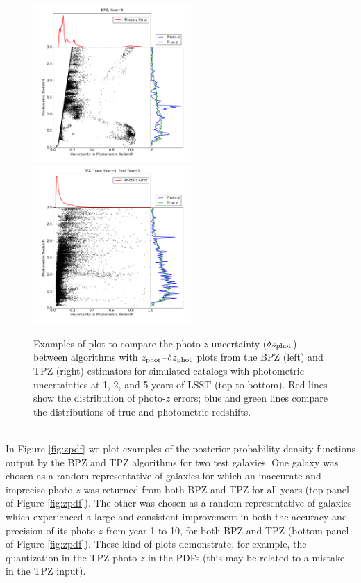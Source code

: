 \documentclass[DM,lsstdraft,toc]{lsstdoc}
\begin{document}
\begin{figure}
\begin{center}
\includegraphics[width=6cm,trim={1cm 1cm 1cm 0cm}, clip]{figures/zp_zpe_bpz_euclid_5_2.png}
\includegraphics[width=6cm,trim={1cm 1cm 1cm 0cm}, clip]{figures/zp_zpe_tpz_euclid_5_5_2.png}
\caption{Examples of plot to compare the photo-$z$ uncertainty ($\delta z_{\rm phot}$) between algorithms with $z_{\rm phot}$--$\delta z_{\rm phot}$ plots from the BPZ (left) and TPZ (right) estimators for simulated catalogs with photometric uncertainties at 1, 2, and 5 years of LSST (top to bottom). Red lines show the distribution of photo-$z$ errors; blue and green lines compare the distributions of true and photometric redshifts. \label{fig:pzpze}}
\end{center}
\end{figure}


\smallskip {} \\
In Figure \ref{fig:zpdf} we plot examples of the posterior probability density functions output by the BPZ and TPZ algorithms for two test galaxies. One galaxy was chosen as a random representative of galaxies for which an inaccurate and imprecise photo-$z$ was returned from both BPZ and TPZ for all years (top panel of Figure \ref{fig:zpdf}). The other was chosen as a random representative of galaxies which experienced a large and consistent improvement in both the accuracy and precision of its photo-$z$ from year 1 to 10, for both BPZ and TPZ (bottom panel of Figure \ref{fig:zpdf}). These kind of plots demonstrate, for example, the quantization in the TPZ photo-$z$ in the PDFs (this may be related to a mistake in the TPZ input). 
\end{document}
